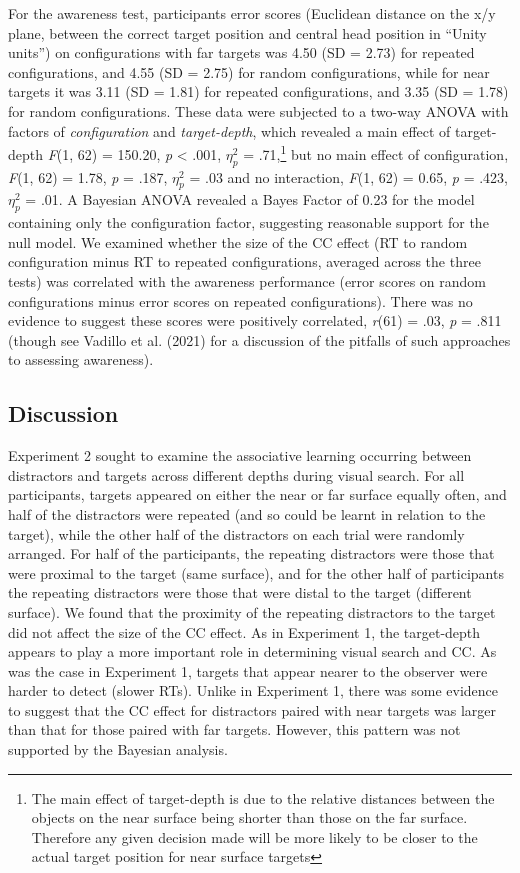 \documentclass[
  english,
  man,floatsintext]{apa7}
\begin{document}
For the awareness test, participants error scores (Euclidean distance on the x/y plane, between the correct target position and central head position in ``Unity units'') on configurations with far targets was 4.50 (SD = 2.73) for repeated configurations, and 4.55 (SD = 2.75) for random configurations, while for near targets it was 3.11 (SD = 1.81) for repeated configurations, and 3.35 (SD = 1.78) for random configurations. These data were subjected to a two-way ANOVA with factors of \emph{configuration} and \emph{target-depth}, which revealed a main effect of target-depth \emph{F}(1, 62) = 150.20, \emph{p} \textless{} .001, \(\eta^2_p\) = .71,\footnote{The main effect of target-depth is due to the relative distances between the objects on the near surface being shorter than those on the far surface. Therefore any given decision made will be more likely to be closer to the actual target position for near surface targets} but no main effect of configuration, \emph{F}(1, 62) = 1.78, \emph{p} = .187, \(\eta^2_p\) = .03 and no interaction, \emph{F}(1, 62) = 0.65, \emph{p} = .423, \(\eta^2_p\) = .01. A Bayesian ANOVA revealed a Bayes Factor of 0.23 for the model containing only the configuration factor, suggesting reasonable support for the null model. We examined whether the size of the CC effect (RT to random configuration minus RT to repeated configurations, averaged across the three tests) was correlated with the awareness performance (error scores on random configurations minus error scores on repeated configurations). There was no evidence to suggest these scores were positively correlated, \emph{r}(61) = .03, \emph{p} = .811 (though see Vadillo et al. (2021) for a discussion of the pitfalls of such approaches to assessing awareness).

\hypertarget{discussion-1}{%
\subsection{Discussion}\label{discussion-1}}

Experiment 2 sought to examine the associative learning occurring between distractors and targets across different depths during visual search. For all participants, targets appeared on either the near or far surface equally often, and half of the distractors were repeated (and so could be learnt in relation to the target), while the other half of the distractors on each trial were randomly arranged. For half of the participants, the repeating distractors were those that were proximal to the target (same surface), and for the other half of participants the repeating distractors were those that were distal to the target (different surface). We found that the proximity of the repeating distractors to the target did not affect the size of the CC effect. As in Experiment 1, the target-depth appears to play a more important role in determining visual search and CC. As was the case in Experiment 1, targets that appear nearer to the observer were harder to detect (slower RTs). Unlike in Experiment 1, there was some evidence to suggest that the CC effect for distractors paired with near targets was larger than that for those paired with far targets. However, this pattern was not supported by the Bayesian analysis.
\end{document}
